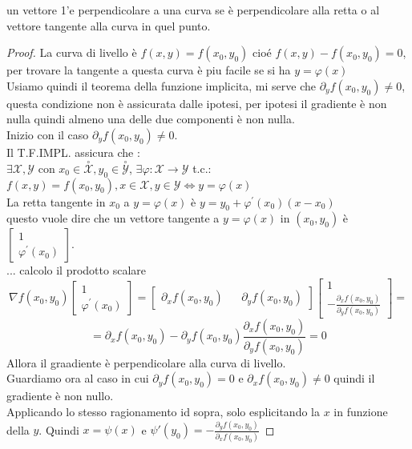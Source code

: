 \observation
un vettore 1'e perpendicolare a una curva se è perpendicolare alla retta o al vettore tangente alla curva in quel punto.
\begin{proof}
	La curva di livello è $f(x,y)=f(x_0,y_0)$ cio\'e $f(x,y)-f(x_0,y_0)=0$, per trovare la tangente a questa curva è piu facile se si ha $y=\varphi(x)$\\
	Usiamo quindi il teorema della funzione implicita, mi serve che $\partial_yf(x_0,y_0)\ne 0$, questa condizione non è assicurata dalle ipotesi, per ipotesi il gradiente è non nulla quindi almeno una delle due componenti è non nulla.\\
	Inizio con il caso $\partial_yf(x_0,y_0)\ne 0$.\\
	Il T.F.IMPL. assicura che :\\
	$\exists\mathcal{X},\mathcal{Y}$ con $x_0\in\overset{\circ}{\mathcal{X}}, y_0\in\overset{\circ}{\mathcal{Y}}$, $\exists\varphi:\mathcal{X}\rightarrow\mathcal{Y}$ t.c.:\\
	$f(x,y)=f(x_0,y_0), x\in\mathcal{X}, y\in\mathcal{Y} \Leftrightarrow y=\varphi(x)$\\
	La retta tangente in $x_0$ a $y=\varphi(x)$ è $y=y_0+\varphi^{'}(x_0)(x-x_0)$\\
	questo vuole dire che un vettore tangente a $y=\varphi(x)$ in $(x_0,y_0)$ è $\begin{bmatrix}1\\\varphi^{'}(x_0)\end{bmatrix}$.\\
	... calcolo il prodotto scalare\\
	$$\nabla f(x_0,y_0)\begin{bmatrix}1\\\varphi^{'}(x_0)\end{bmatrix} = \begin{bmatrix}\partial_x f(x_0,y_0)&&\partial_y f(x_0,y_0)\end{bmatrix}\begin{bmatrix}1\\-\frac{\partial_x f(x_0,y_0)}{\partial_y f(x_0,y_0)}\end{bmatrix} =$$ 
	$$=\partial_x f(x_0,y_0) -\partial_y f(x_0,y_0)\frac{\partial_x f(x_0,y_0)}{\partial_y f(x_0,y_0)}=0$$
	Allora il graadiente è perpendicolare alla curva di livello.\\
	Guardiamo ora al caso in cui $\partial_yf(x_0,y_0)= 0$ e $\partial_xf(x_0,y_0)\ne 0$ quindi il gradiente è non nullo.\\
	Applicando lo stesso ragionamento id sopra, solo esplicitando la $x$ in funzione della $y$. Quindi $x=\psi(x)$ e $\psi{'}(y_0)=-\frac{\partial_y f(x_0,y_0)}{\partial_x f(x_0,y_0)}$
\end{proof}

